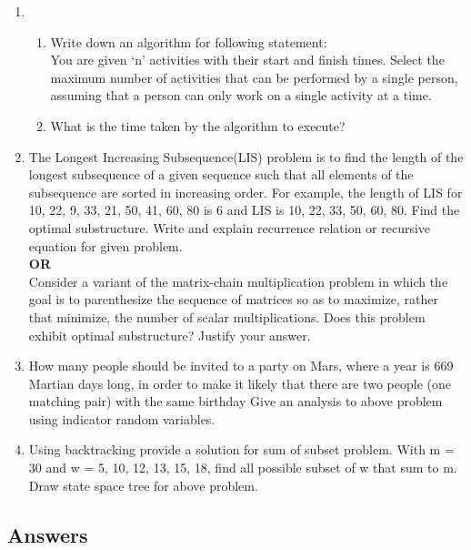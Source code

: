 \documentclass{exmppr}
\begin{document}
\begin{enumerate}
\item \begin{enumerate}
\item Write down an algorithm for following statement:\\
You are given `n' activities with their start and finish times. Select the maximum number of activities that can be performed by a single person, assuming that a person can only work on a single activity at a time.
\item What is the time taken by the algorithm to execute?
\end{enumerate}

\item The Longest Increasing Subsequence(LIS) problem is to find the length of the longest subsequence of a given sequence such that all elements of the subsequence are sorted in increasing order. For example, the length of LIS for {10, 22, 9, 33, 21, 50, 41, 60, 80} is 6 and LIS is {10, 22, 33, 50, 60, 80}. Find the optimal substructure. Write and explain recurrence relation or recursive equation for given problem.\\
{\centering \textbf{OR}}
\\
Consider a variant of the matrix-chain multiplication problem in which the goal is to parenthesize the sequence of matrices so as to maximize, rather that minimize, the number of scalar multiplications. Does this problem exhibit optimal substructure? Justify your answer.

\item How many people should be invited to a party on Mars, where a year is 669 Martian days long, in order to make it likely that there are two people (one matching pair) with the same birthday Give an analysis to above problem using indicator random variables.

\item Using backtracking provide a solution for sum of subset problem. With m = 30 and w = {5, 10, 12, 13, 15, 18}, find all possible subset of w that sum to m. Draw state space tree for above problem.

\end{enumerate}

\newpage
\begin{center}\section*{Answers}\end{center}
%
\end{document}
